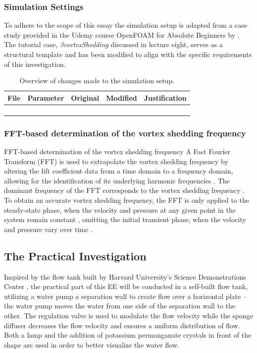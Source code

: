 \subsubsection{Simulation Settings}
To adhere to the scope of this essay the simulation setup is adapted from a case study provided in the Udemy course OpenFOAM for Absolute Beginners by \textcite{jayaraj2024openfoam}. The tutorial case, \textit{3vortexShedding} discussed in lecture eight, serves as a structural template and has been modified to align with the specific requirements of this investigation.

\begin{table}[H]
	\centering
	\begin{tabular}{|l|l|l|l|p{5cm}|}
		\hline
		\textbf{File} & \textbf{Parameter} & \textbf{Original} & \textbf{Modified} & \textbf{Justification} \\
		\hline
		&  &  &  &  \\
		\hline
		&  &  &  &  \\
		\hline
		&  &  &  &  \\
		\hline
		&  &  &  &  \\
		\hline
	\end{tabular}
	\caption{Overview of changes made to the simulation setup.}
	\label{tab:simulation_changes}
\end{table}


\subsubsection{FFT-based determination of the vortex shedding frequency}
FFT-based determination of the vortex shedding frequency
A Fast Fourier Transform (FFT) is used to extrapolate the vortex shedding frequency by altering the lift coefficient data from a time domain to a frequency domain, allowing for the identification of its underlying harmonic frequencies \parencite[10--11]{shi2025vortex}. The dominant frequency of the FFT corresponds to the vortex shedding frequency \parencite[12]{xu_experimental_2025}. To obtain an accurate vortex shedding frequency, the FFT is only applied to the steady-state phase, when the velocity and pressure at any given point in the system remain constant \parencite{noauthor_steady_nodate}, omitting the initial transient phase, when the velocity and pressure vary over time \parencite{noauthor_transient_nodate}. 

\subsection{The Practical Investigation}
Inspired by the flow tank built by Harvard University’s Science Demonstrations Center \parencite{noauthor_vortex_nodate}, the practical part of this EE will be conducted in a self-built flow tank, utilizing a water pump a separation wall to create flow over a horizontal plate – the water pump moves the water from one side of the separation wall to the other. The regulation valve is used to modulate the flow velocity while the sponge diffuser decreases the flow velocity and ensures a uniform distribution of flow. Both a lamp and the addition of potassium permanganate crystals in front of the shape are used in order to better visualize the water flow. 

